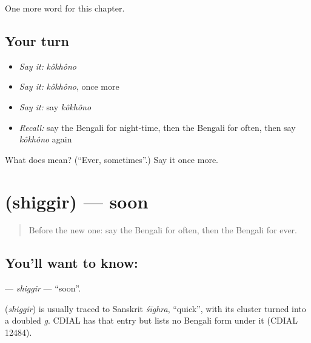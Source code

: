 \begin{grammarlens}[title={What you've built}]
One more word for this chapter.
\end{grammarlens}

\subsection*{Your turn}
\begin{itemize}
\raggedright
  \item \emph{Say it:} \emph{kôkhôno}
  \item \emph{Say it:} \emph{kôkhôno}, once more
  \item \emph{Say it:} say \emph{kôkhôno}
  \item \emph{Recall:} say the Bengali for night-time, then the Bengali for often, then say \emph{kôkhôno} again
\end{itemize}

\begin{tcolorbox}[breakable,colback=teal!4,colframe=teal!35!black,title={Before you move on}]
What does  mean? (\textquotedblleft{}Ever, sometimes\textquotedblright{}.) Say it once more.
\end{tcolorbox}
\section[\texorpdfstring{\bn{শিগগির} (shiggir)}{শিগগির (shiggir)}]{ (shiggir) — soon}

\label{lesson:BN-C94-shiggir}



\begin{quote}
Before the new one: say the Bengali for often, then the Bengali for ever.
\end{quote}

\subsection*{You'll want to know: }
\textbf{} — \emph{shiggir} — \textquotedblleft{}soon\textquotedblright{}.

\begin{cousinweb}
\textbf{} (\emph{shiggir}) is usually traced to Sanskrit \emph{śīghra}, \textquotedblleft{}quick\textquotedblright{}, with its cluster turned into a doubled \emph{g}. CDIAL has that entry but lists no Bengali form under it (CDIAL 12484).
\end{cousinweb}

